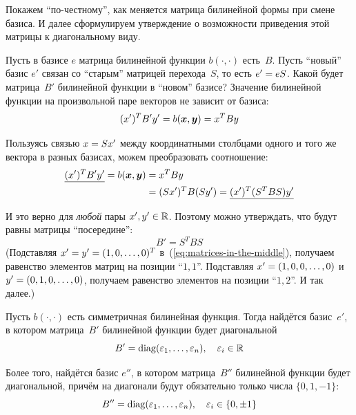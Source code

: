 \documentclass[a4paper,12pt]{article}
\begin{document}
  Покажем ``по-честному'', как меняется матрица билинейной формы при смене базиса.
  И далее сформулируем утверждение о возможности приведения этой матрицы к диагональному виду.

  Пусть в базисе $e$ матрица билинейной функции $b(\cdot, \cdot)$ есть~$B$.
  Пусть ``новый'' базис $e'$ связан со ``старым'' матрицей перехода~$S$, то есть $e' \hm= eS$.
  Какой будет матрица~$B'$ билинейной функции в ``новом'' базисе?
  Значение билинейной функции на произвольной паре векторов не зависит от базиса:
  \[
    (x')^T B' y' = b(\boldsymbol x, \boldsymbol y) = x^T B y
  \]

  Пользуясь связью $x \hm= Sx'$ между координатными столбцами одного и того же вектора в разных базисах, можем преобразовать соотношение:
  \begin{equation}\label{eq:matrices-in-the-middle}
  \begin{split}
    \underline{(x')^T B' y'} = b(\boldsymbol x, \boldsymbol y) &= x^T B y\\
    &= (Sx')^T B (Sy') = \underline{(x')^T (S^T B S) y'}
  \end{split}
  \end{equation}
  
  
  \newpage
  
  \hfill \vphantom{.}
  
  \newpage
  
  
  И это верно для \emph{любой} пары $x', y' \hm\in \RR$.
  Поэтому можно утверждать, что будут равны матрицы ``посередине'':
  \begin{equation}\label{eq:matrix-change}
    \boxed{B' = S^T B S}
  \end{equation}
  (Подставляя $x' \hm= y' \hm= (1, 0, \ldots, 0)^T$ в~(\ref{eq:matrices-in-the-middle}), получаем равенство элементов матриц на позиции ``$1,1$''.
  Подставляя $x' \hm= (1, 0, 0, \ldots, 0)$ и $y' \hm= (0, 1, 0, \ldots, 0)$, получаем равенство элементов на позиции ``$1,2$''.
  И так далее.)

  \begin{theorem}
    Пусть $b(\cdot, \cdot)$ есть симметричная билинейная функция.
    Тогда найдётся базис~$e'$, в котором матрица~$B'$ билинейной функции будет диагональной
    \[
      B' = \operatorname{diag}(\varepsilon_1, \ldots, \varepsilon_n),\quad \varepsilon_i \in \operatorname{\mathbb R}
    \]
    
    Более того, найдётся базис $e''$, в котором матрица~$B''$ билинейной функции будет диагональной, причём на диагонали будут обязательно только числа $\{0, 1, -1\}$:
    \begin{equation}\label{eq:canonical-matrix}
      B'' = \operatorname{diag}(\varepsilon_1, \ldots, \varepsilon_n),\quad \varepsilon_i \in \{0, \pm 1\}
    \end{equation}
  \end{theorem}
  
\end{document}
